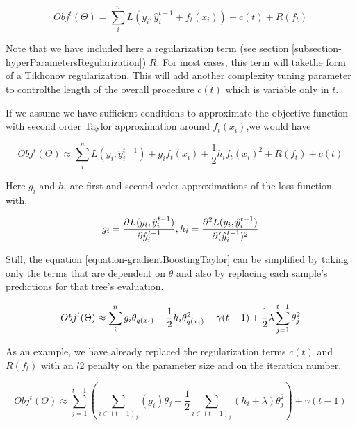 \documentclass{article}%
\theoremstyle{definition}
\begin{document}
\begin{equation}
Obj^t(\Theta) =  \sum_i^n L(y_i, \hat{y}^{t-1}_i +  f_t(x_i) ) + c(t) + R(f_t) 
\end{equation}


Note that we have included here a regularization term (see section \ref{subsection-hyperParametersRegularization}) $R$. For most cases,  this term will takethe form of a Tikhonov regularization. This will add another complexity tuning parameter to controlthe length of the overall procedure $c(t)$ which is variable only in $t$. 

If we assume we have sufficient conditions to approximate the objective function with second order Taylor approximation around $f_t(x_i)$,we would have

\begin{equation}\label{equation-gradientBoostingTaylor}
Obj^t(\Theta) \approx \sum_i^n {L(y_i, \hat{y}^{t-1}_i) + g_i f_t(x_i) + \frac{1}{2} h_i f_t(x_i)^2 } +  R(f_t) +  c(t)
\end{equation}

Here $g_i$ and $h_i$ are first and second order approximations of the loss function with,

\[
g_i =  \frac{\partial L(y_i, \hat{y}^{t-1}_i)}{\partial \hat{y}^{t-1}_i}, \  \\
h_i =  \frac{\partial^2 L(y_i, \hat{y}^{t-1}_i)}{\partial (\hat{y}^{t-1}_i)^2 }
\]

Still, the equation \ref{equation-gradientBoostingTaylor} can be simplified by taking only the terms that are dependent on $\theta$ and also by replacing each sample's predictions for that tree's evaluation.

\begin{equation} \label{eq:gb-objSteps1}
Obj^t(\Theta) \approx  \sum_i^n {g_i \theta_{q(x_i)} + \frac{1}{2} h_i \theta_{q(x_i)}^2 } + \gamma ({t-1}) + \frac{1}{2}\lambda \sum_{j=1}^{t-1} \theta_j^2 \\
\end{equation}

As an example, we have already replaced the regularization terms $c(t)$ and $R(f_t)$ with an $l$2 penalty on the parameter size and on the iteration number. 

\begin{equation} \label{eq:gb-objSteps1}
Obj^t(\Theta) \approx   \sum_{j=1}^{t-1} \left(  \sum_{i \in ({t-1})_j} (g_i )\theta_{j} + \frac{1}{2} \sum_{i \in ({t-1})_j} (h_i + \lambda ) \theta_{j}^2  \right) + \gamma ({t-1})
\end{equation}
\end{document}
